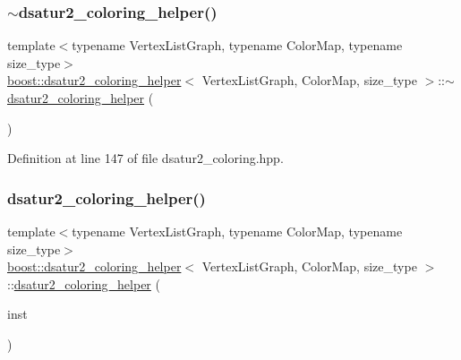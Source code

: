 \subsubsection{\texorpdfstring{$\sim$dsatur2\+\_\+coloring\+\_\+helper()}{~dsatur2\_coloring\_helper()}}
{\footnotesize\ttfamily template$<$typename Vertex\+List\+Graph, typename Color\+Map, typename size\+\_\+type$>$ \\
\hyperlink{classboost_1_1dsatur2__coloring__helper}{boost\+::dsatur2\+\_\+coloring\+\_\+helper}$<$ Vertex\+List\+Graph, Color\+Map, size\+\_\+type $>$\+::$\sim$\hyperlink{classboost_1_1dsatur2__coloring__helper}{dsatur2\+\_\+coloring\+\_\+helper} (\begin{DoxyParamCaption}{ }\end{DoxyParamCaption})\hspace{0.3cm}{\ttfamily [inline]}}



Definition at line 147 of file dsatur2\+\_\+coloring.\+hpp.

\mbox{\label{classboost_1_1dsatur2__coloring__helper_adc4502c8a6a86fc1fd801c35e38f9f57}} 
\subsubsection{\texorpdfstring{dsatur2\+\_\+coloring\+\_\+helper()}{dsatur2\_coloring\_helper()}\hspace{0.1cm}{\footnotesize\ttfamily [2/2]}}
{\footnotesize\ttfamily template$<$typename Vertex\+List\+Graph, typename Color\+Map, typename size\+\_\+type$>$ \\
\hyperlink{classboost_1_1dsatur2__coloring__helper}{boost\+::dsatur2\+\_\+coloring\+\_\+helper}$<$ Vertex\+List\+Graph, Color\+Map, size\+\_\+type $>$\+::\hyperlink{classboost_1_1dsatur2__coloring__helper}{dsatur2\+\_\+coloring\+\_\+helper} (\begin{DoxyParamCaption}\item[{const \hyperlink{classboost_1_1dsatur2__coloring__helper}{dsatur2\+\_\+coloring\+\_\+helper}$<$ Vertex\+List\+Graph, Color\+Map, size\+\_\+type $>$ \&}]{inst }\end{DoxyParamCaption})\hspace{0.3cm}{\ttfamily [delete]}}



